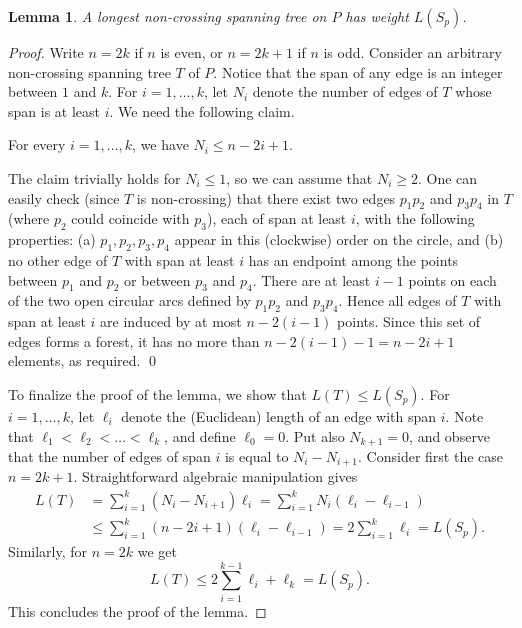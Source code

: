 \documentclass[11pt]{article}
\newtheorem{lemma}{Lemma}
\begin{document}
\begin{lemma} \label{L1}
A longest non-crossing spanning tree on $P$ has weight $L(S_p)$.
\end{lemma}
\begin{proof}
Write $n=2k$ if $n$ is even, or $n=2k+1$ if $n$ is odd.
Consider an arbitrary non-crossing spanning tree $T$ of $P$.
Notice that the span of any edge is an integer between $1$ and $k$.
For $i=1,\ldots , k$, let $N_i$ denote the number of edges of $T$ whose
span is at least $i$. We need the following claim.

\smallskip
{}
For every $i=1,\ldots , k$, we have $N_i \leq n-2i+1$.

\smallskip
{}
The claim trivially holds for $N_i \leq 1$, so we can assume that
$N_i \geq 2$. One can easily check (since $T$ is non-crossing) that
there exist two edges $p_1 p_2$ and $p_3 p_4$ in $T$ (where $p_2$
could coincide with $p_3$), each of span at least $i$, with the
following properties:
(a) $p_1,p_2,p_3,p_4$ appear in this (clockwise) order on the circle,
and (b) no other edge of $T$ with span at least $i$ has an endpoint
among the points between $p_1$ and $p_2$ or between $p_3$ and $p_4$.
There are at least $i-1$ points on each of the two open circular arcs
defined by $p_1 p_2$ and $p_3 p_4$. Hence all edges
of $T$ with span at least $i$ are induced by at most $n-2(i-1)$ points.
Since this set of edges forms a forest, it has no more than
$n-2(i-1)-1=n-2i+1$ elements, as required.
\qed

\medskip
To finalize the proof of the lemma, we show that $L(T) \leq L(S_p)$.
For $i=1,\ldots ,k$, let $\ell_i$ denote the (Euclidean) length of
an edge with span $i$. Note that $\ell_1<\ell_2<\ldots<\ell_k$, and
define $\ell_0=0$. Put also $N_{k+1}=0$, and observe that the number of edges
of span $i$ is equal to $N_i - N_{i+1}$. Consider first the case $n=2k+1$.
Straightforward algebraic manipulation gives
\begin{align*}
L(T) &= \sum_{i=1}^k (N_i - N_{i+1}) \ell_i =
\sum_{i=1}^k N_i (\ell_i -\ell_{i-1}) \\
&\leq \sum_{i=1}^k (n-2i+1) (\ell_i -\ell_{i-1}) =
2 \sum_{i=1}^k \ell_i = L(S_p).
\end{align*}
Similarly, for $n=2k$ we get
$$ L(T) \leq 2 \sum_{i=1}^{k-1} \ell_i + \ell_k = L(S_p). $$
This concludes the proof of the lemma.
\end{proof}
\end{document}
